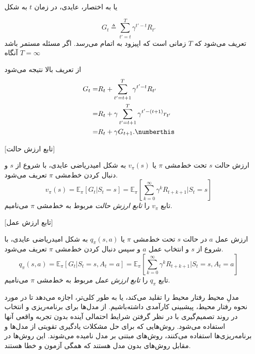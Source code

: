  یا به اختصار، عایدی، در زمان $t$ به شکل

$$G_t \triangleq \sum_{t'=t}^{T} \gamma^{t'-t} R_{t'}$$
تعریف می‌شود که $T$ زمانی است که اپیزود به اتمام می‌رسد. اگر مسئله مستمر باشد آنگاه 
$T=\infty$

از تعریف بالا نتیجه می‌شود 
\begin{align}
G_t =& R_t + \sum_{t'=t+1}^{T} \gamma^{t'-t} R_{t'} \nonumber \\
=& R_t + \gamma \sum_{t'=t+1}^{T} \gamma^{t' - (t+1)} r_{t'} \nonumber \\
=& R_t + \gamma G_{t+1}. \numberthis
\end{align}

[تابع ارزش حالت]

 ارزش حالت $s$ تحت خط‌مشی $\pi$ یا $v_\pi(s)$ به شکل امیدریاضی عایدی، با شروع از $s$ و دنبال کردن خط‌مشی $\pi$ تعریف می‌شود.
$$v_\pi(s) = \mathbb{E}_\pi\left[G_t| S_t=s\right] = \mathbb{E}_\pi\left[\sum_{k=0}^{\infty} \gamma^k R_{t+k+1}|S_t =s \right]$$
تابع $v_\pi$ را 
\textit{تابع ارزش حالت}
 مربوط به خط‌مشی 
$\pi$
می‌نامیم.

[تابع ارزش عمل]

ارزش عمل  $a$ در حالت
$s$
 تحت خط‌مشی $\pi$ یا 
 $q_\pi(s,a)$
  به شکل امیدریاضی عایدی، با شروع از $s$ و انتخاب عمل $a$  و سپس دنبال کردن خط‌مشی $\pi$ تعریف می‌شود.
$$q_\pi(s,a) = \mathbb{E}_\pi\left[G_t| S_t=s, A_t=a\right] = \mathbb{E}_\pi\left[\sum_{k=0}^{\infty} \gamma^k R_{t+k+1}|S_t =s, A_t=a \right]$$
تابع $q_\pi$ را 
\textit{تابع ارزش عمل}
 مربوط به خط‌مشی 
$\pi$
می‌نامیم.

مدلِ محیط رفتار محیط را تقلید می‌کند، یا به طور کلی‌تر، اجازه می‌دهد تا در مورد نحوه رفتار محیط، پیشبینی کارآمدی داشته‌باشیم. از مدل‌ها برای برنامه‌ریزی و انتخاب در روند تصمیم‌گیری  با در نظر گرفتن شرایط احتمالی آینده بدون تجربه واقعی آنها استفاده می‌شود.
روش‌هایی که برای حل مشکلات یادگیری تقویتی از مدل‌ها و برنامه‌ریزی‌ها استفاده می‌کنند، روش‌های مبتنی بر مدل نامیده می‌شوند. این روش‌ها در مقابل روش‌های بدون مدل هستند که همگی آزمون و خطا هستند.

